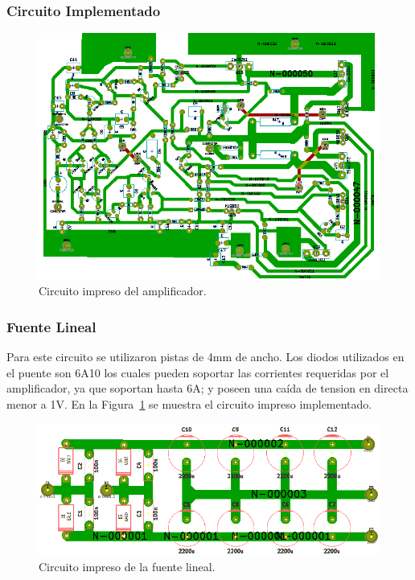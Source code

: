 \subsubsection{Circuito Implementado}
\begin{figure}[H]
\centerline{
\includegraphics[width=1\textwidth]{img/circuito_implementado_todo.png}}
\caption{Circuito impreso del amplificador.}
\end{figure}

\subsubsection{Fuente Lineal}
\medskip
Para este circuito se utilizaron pistas de 4mm de ancho. Los diodos utilizados en el puente son 6A10 los cuales pueden soportar las corrientes requeridas por el amplificador, ya que soportan hasta 6A; y poseen una caída de tension en directa menor a 1V.
En la Figura~\ref{circuito_impreso_fuente_lineal} se muestra el circuito impreso implementado. 

\begin{figure}[H]
\centering
\centerline{\includegraphics[width=1\textwidth]{img/circuito_impreso_fuente_lineal.png}}
\caption{Circuito impreso de la fuente lineal.}
\label{circuito_impreso_fuente_lineal} 
\end{figure}
\medskip
